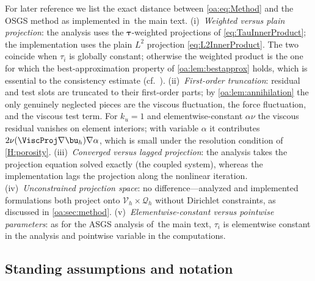 \begin{remark}
\label{oa:rem:analyzed}
For later reference we list the exact distance between \cref{oa:eq:Method} and the OSGS
method as implemented in~the main text. (i)~\emph{Weighted versus plain projection}:
the analysis uses the $\boldsymbol{\tau}$-weighted projections of
\cref{eq:TauInnerProduct}; the implementation uses the plain $L^2$ projection \cref{eq:L2InnerProduct}. The two
coincide when $\tau_i$ is globally constant; otherwise the weighted product is the one
for which the best-approximation property of \cref{oa:lem:bestapprox} holds, which is
essential to the consistency estimate (cf.~\cite[Remark~4]{codina2008analysis}).
(ii)~\emph{First-order truncation}: residual and test slots are truncated to their
first-order parts; by \cref{oa:lem:annihilation} the only genuinely neglected pieces are
the viscous fluctuation, the force fluctuation, and the viscous test term. For $k_u = 1$
and elementwise-constant $\alpha\nu$ the viscous residual vanishes on element interiors;
with variable $\alpha$ it contributes $2\nu(\ViscProj\nabla\bu_h)\nabla\alpha$, which is
small under the resolution condition of \cref{H:porosity}. (iii)~\emph{Converged versus lagged
projection}: the analysis takes the projection equation solved exactly (the coupled
system), whereas the implementation lags the projection along the nonlinear iteration.
(iv)~\emph{Unconstrained projection space}: no difference---analyzed and implemented
formulations both project onto $\mathcal{V}_h\times\mathcal{Q}_h$ without Dirichlet
constraints, as discussed in \cref{oa:sec:method}.
(v)~\emph{Elementwise-constant versus pointwise parameters}: as for the ASGS analysis
of~the main text, $\tau_{i}$ is elementwise constant in the analysis and pointwise
variable in the computations.
\end{remark}

\subsection{Standing assumptions and notation}
\label{oa:sec:hypotheses}

